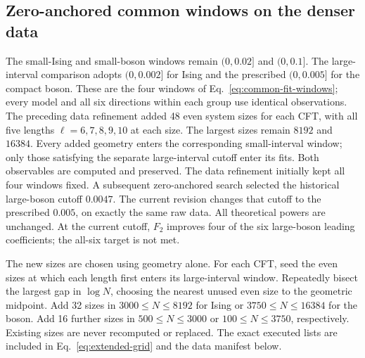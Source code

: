 \clearpage
\subsection{Zero-anchored common windows on the denser data}
\label{sec:common-window-results}
The small-Ising and small-boson windows remain $(0,0.02]$ and
$(0,0.1]$. The large-interval comparison adopts $(0,0.002]$ for Ising
and the prescribed $(0,0.005]$ for the compact boson. These are the
four windows of Eq.~\eqref{eq:common-fit-windows}; every model and
all six directions within each group use identical observations.
The preceding data refinement added 48 even system sizes for each CFT, with all five
lengths $\ell=6,7,8,9,10$ at each size. The largest sizes remain
$8192$ and $16384$. Every added geometry enters the corresponding
small-interval window; only those satisfying the separate large-interval
cutoff enter its fits. Both observables are computed and preserved.
The data refinement initially kept all four windows fixed. A subsequent
zero-anchored search selected the historical large-boson cutoff $0.0047$.
The current revision changes that cutoff to the prescribed $0.005$,
on exactly the same raw data. All theoretical powers are unchanged.
At the current cutoff, $F_2$ improves four of the six large-boson
leading coefficients; the all-six target is not met.

The new sizes are chosen using geometry alone. For each CFT, seed
the even sizes at which each length first enters its large-interval
window. Repeatedly bisect the largest gap in $\log N$, choosing the
nearest unused even size to the geometric midpoint. Add 32 sizes
in $3000\leq N\leq8192$ for Ising or $3750\leq N\leq16384$ for
the boson. Add 16 further sizes in $500\leq N\leq3000$ or
$100\leq N\leq3750$, respectively. Existing sizes are never
recomputed or replaced. The exact executed lists are included in
Eq.~\eqref{eq:extended-grid} and the data manifest below.


\begingroup\footnotesize

\endgroup


\begingroup\footnotesize

\endgroup


\begingroup\footnotesize

\clearpage

\endgroup



